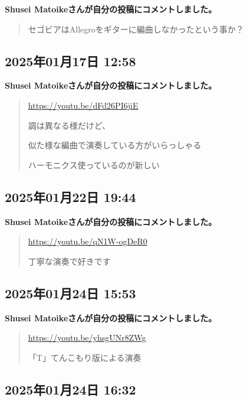 \textbf{Shusei Matoikeさんが自分の投稿にコメントしました。}

\begin{quote}
セゴビアはAllegroをギターに編曲しなかったという事か？
\end{quote}

\subsection*{2025年01月17日 12:58}

\textbf{Shusei Matoikeさんが自分の投稿にコメントしました。}

\begin{quote}
\url{https://youtu.be/dFd26PI6jiE}

調は異なる様だけど、

似た様な編曲で演奏している方がいらっしゃる

ハーモニクス使っているのが新しい
\end{quote}

\subsection*{2025年01月22日 19:44}

\textbf{Shusei Matoikeさんが自分の投稿にコメントしました。}

\begin{quote}
\url{https://youtu.be/qN1W-ogDeR0}

丁寧な演奏で好きです
\end{quote}

\subsection*{2025年01月24日 15:53}

\textbf{Shusei Matoikeさんが自分の投稿にコメントしました。}

\begin{quote}
\url{https://youtu.be/yhsgUNr8ZWg}

「T」てんこもり版による演奏
\end{quote}

\subsection*{2025年01月24日 16:32}


